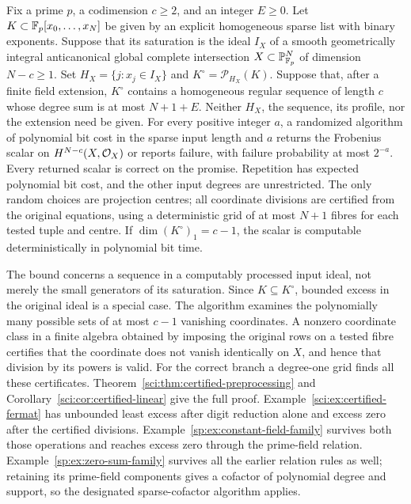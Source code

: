 \begin{theorem}\label{thm:saturation-random-intro}
Fix a prime $p$, a codimension $c\ge2$, and an integer $E\ge0$.
Let $K\subset\mathbb F_p[x_0,\ldots,x_N]$ be given by an explicit
homogeneous sparse list with binary exponents. Suppose that its
saturation is the ideal $I_X$ of a smooth geometrically integral
anticanonical global complete intersection
$X\subset\mathbb P^N_{\mathbb F_p}$ of dimension $N-c\ge1$.
Set $H_X=\{j:x_j\in I_X\}$ and $K^\circ=\mathcal P_{H_X}(K)$.
Suppose that, after a finite field extension, $K^\circ$ contains a
homogeneous regular sequence of length $c$ whose degree sum is at
most $N+1+E$. Neither $H_X$, the sequence, its profile, nor the
extension need be given.
For every positive integer $a$, a randomized algorithm of polynomial
bit cost in the sparse input length and $a$ returns the Frobenius
scalar on $H^{N-c}(X,\mathcal O_X)$ or reports failure, with failure
probability at most $2^{-a}$. Every returned scalar is correct on
the promise. Repetition has expected polynomial bit cost, and the
other input degrees are unrestricted. The only random choices are
projection centres; all coordinate divisions are certified from the
original equations, using a deterministic grid of at most $N+1$
fibres for each tested tuple and centre.
If $\dim(K^\circ)_1=c-1$, the scalar is computable deterministically
in polynomial bit time.
\end{theorem}

The bound concerns a sequence in a computably processed input ideal,
not merely the small generators of its saturation. Since
$K\subseteq K^\circ$, bounded excess in the original ideal is a
special case. The algorithm examines the polynomially many possible
sets of at most $c-1$ vanishing coordinates. A nonzero coordinate
class in a finite algebra obtained by imposing the original rows on a
tested fibre certifies that the
coordinate does not vanish identically on $X$, and hence that division
by its powers is valid. For the correct branch a degree-one grid finds
all these certificates. Theorem~\ref{sci:thm:certified-preprocessing}
and Corollary~\ref{sci:cor:certified-linear} give the full proof.
Example~\ref{sci:ex:certified-fermat} has unbounded least excess after
digit reduction alone and excess zero after the certified divisions.
Example~\ref{sp:ex:constant-field-family} survives both those
operations and reaches excess zero through the prime-field relation.
Example~\ref{sp:ex:zero-sum-family} survives all the earlier relation
rules as well; retaining its prime-field components gives a cofactor
of polynomial degree and support, so the designated sparse-cofactor
algorithm applies.

